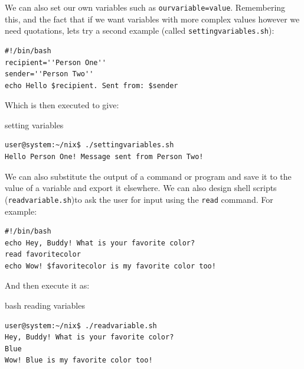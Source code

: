 \documentclass[11pt]{article}
\begin{document}
We can also set our own variables such as \texttt{ourvariable=value}. Remembering this, and the fact that if  we want variables with more complex values however we need quotations, lets try a second example (called \texttt{settingvariables.sh}):\\

\begin{listing}[H]
\begin{verbatim}
#!/bin/bash
recipient=''Person One''
sender=''Person Two''
echo Hello $recipient. Sent from: $sender
\end{verbatim}
\end{listing}

\noindent
Which is then executed to give:\\

\begin{listing}[H]
\caption{setting variables}\vspace{-0.1in}
\begin{verbatim}
user@system:~/nix$ ./settingvariables.sh
Hello Person One! Message sent from Person Two!
\end{verbatim}
\end{listing}
We can also substitute the output of a command or program and save it to the value of a variable and export it elsewhere. We can also design shell scripts (\texttt{readvariable.sh})to ask the user for input using the \texttt{read} command. For example:\\

\begin{listing}[H]
\begin{verbatim}
#!/bin/bash
echo Hey, Buddy! What is your favorite color?
read favoritecolor
echo Wow! $favoritecolor is my favorite color too!
\end{verbatim}
\end{listing}

And then execute it as:\\

\begin{listing}[H]
\caption{bash reading variables}\vspace{-0.1in}
\begin{verbatim}
user@system:~/nix$ ./readvariable.sh
Hey, Buddy! What is your favorite color?
Blue
Wow! Blue is my favorite color too!
\end{verbatim}
\end{listing}
\end{document}
